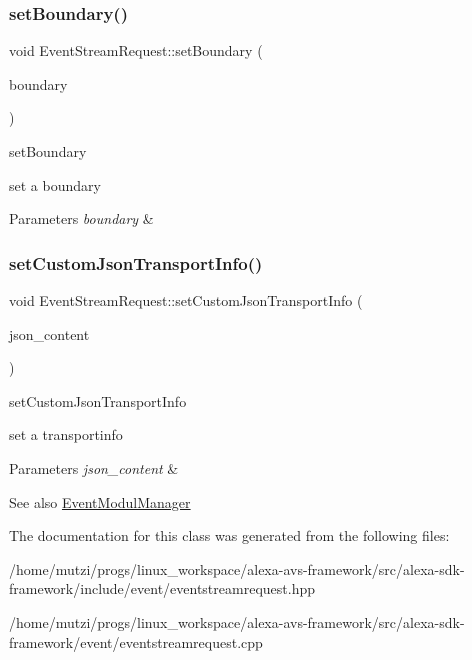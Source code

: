 \subsubsection{\texorpdfstring{set\+Boundary()}{setBoundary()}}
{\footnotesize\ttfamily void Event\+Stream\+Request\+::set\+Boundary (\begin{DoxyParamCaption}\item[{const char $\ast$}]{boundary }\end{DoxyParamCaption})}



set\+Boundary 

set a boundary 
\begin{DoxyParams}{Parameters}
{\em boundary} & \\
\hline
\end{DoxyParams}
\mbox{\label{classAlexaEvent_1_1EventStreamRequest_ac9768da8142180ef8dcd53268ffb3a8e}} 
\subsubsection{\texorpdfstring{set\+Custom\+Json\+Transport\+Info()}{setCustomJsonTransportInfo()}}
{\footnotesize\ttfamily void Event\+Stream\+Request\+::set\+Custom\+Json\+Transport\+Info (\begin{DoxyParamCaption}\item[{\hyperlink{classAlexaEvent_1_1TransportInfo}{Transport\+Info} $\ast$}]{json\+\_\+content }\end{DoxyParamCaption})}



set\+Custom\+Json\+Transport\+Info 

set a transportinfo 
\begin{DoxyParams}{Parameters}
{\em json\+\_\+content} & \\
\hline
\end{DoxyParams}
\begin{DoxySeeAlso}{See also}
\hyperlink{classAlexaEvent_1_1EventModulManager}{Event\+Modul\+Manager} 
\end{DoxySeeAlso}


The documentation for this class was generated from the following files\+:\begin{DoxyCompactItemize}
\item 
/home/mutzi/progs/linux\+\_\+workspace/alexa-\/avs-\/framework/src/alexa-\/sdk-\/framework/include/event/eventstreamrequest.\+hpp\item 
/home/mutzi/progs/linux\+\_\+workspace/alexa-\/avs-\/framework/src/alexa-\/sdk-\/framework/event/eventstreamrequest.\+cpp\end{DoxyCompactItemize}
